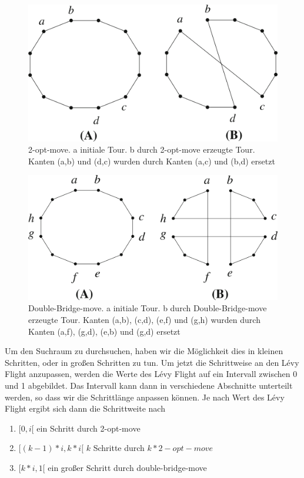 \documentclass[conference]{IEEEtran}
\begin{document}
      \begin{figure}
      \centering
        \includegraphics[width=0.8\linewidth]{2-opt-move.png}
        \caption{2-opt-move. a initiale Tour. b durch 2-opt-move erzeugte Tour. Kanten (a,b) und (d,c) wurden durch Kanten (a,c) und (b,d) ersetzt}
        \label{fig:2-opt-move}
      \end{figure}

      \begin{figure}
      \centering
        \includegraphics[width=0.8\linewidth]{double-Bridge.png}
        \caption{Double-Bridge-move. a initiale Tour. b durch Double-Bridge-move erzeugte Tour. Kanten 
        (a,b), (c,d), (e,f) und (g,h) wurden durch Kanten (a,f), (g,d), (e,b) und (g,d) ersetzt}
        \label{fig:double-bridge-move}
      \end{figure}

      Um den Suchraum zu durchsuchen, haben wir die Möglichkeit dies in kleinen Schritten, 
      oder in großen Schritten zu tun. Um jetzt die Schrittweise an den Lévy Flight anzupassen, 
      werden die Werte des Lévy Flight auf ein Intervall zwischen 0 und 1 abgebildet. Das Intervall kann dann in 
      verschiedene Abschnitte unterteilt werden, so dass wir die Schrittlänge anpassen können.
      Je nach Wert des Lévy Flight ergibt sich dann die Schrittweite nach
      \begin{enumerate}
        \item$[0,i[$ ein Schritt durch 2-opt-move
        \item$[(k-1)*i, k*i[$ $k$ Schritte durch $k * 2-opt-move$
        \item$[k*i,1[$ ein großer Schritt durch double-bridge-move
      \end{enumerate}
\end{document}
